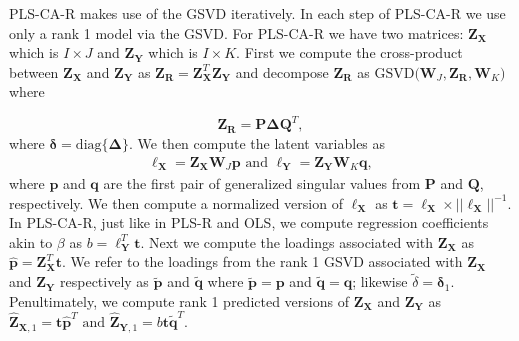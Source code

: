 \documentclass[12pt]{article}
\begin{document}
PLS-CA-R makes use of the GSVD iteratively. In each step of PLS-CA-R we
use only a rank 1 model via the GSVD. For PLS-CA-R we have two matrices:
\({\mathbf Z}_{\mathbf X}\) which is \(I \times J\) and
\({\mathbf Z}_{\mathbf Y}\) which is \(I \times K\). First we compute
the cross-product between \({\mathbf Z}_{\mathbf X}\) and
\({\mathbf Z}_{\mathbf Y}\) as
\({\mathbf Z}_{\mathbf R} = {\mathbf Z}_{\mathbf X}^{T}{\mathbf Z}_{\mathbf Y}\)
and decompose \({\mathbf Z}_{\mathbf R}\) as
\(\mathrm{GSVD(} {\mathbf W}_{J}, {\mathbf Z}_{\mathbf R}, {\mathbf W}_{K} \mathrm{)}\)
where

\begin{equation}
{\mathbf Z}_{\mathbf R} = {\mathbf P} {\boldsymbol \Delta} {\mathbf Q}^{T},
\end{equation} where
\({\boldsymbol \delta} = \mathrm{diag\{} {\boldsymbol \Delta} \mathrm{\}}\).
We then compute the latent variables as \begin{equation}
\begin{aligned}
{\boldsymbol \ell}_{\mathbf X} = {\mathbf Z}_{\mathbf X}{\mathbf W}_{J}{\mathbf p} \text{ and } {\boldsymbol \ell}_{\mathbf Y} = {\mathbf Z}_{\mathbf Y}{\mathbf W}_{K}{\mathbf q},
\label{eq:lvs}
\end{aligned}
\end{equation} where \({\mathbf p}\) and \({\mathbf q}\) are the first
pair of generalized singular values from \({\mathbf P}\) and
\({\mathbf Q}\), respectively. We then compute a normalized version of
\({\boldsymbol \ell}_{\mathbf X}\) as
\({\mathbf t} = {\boldsymbol \ell}_{\mathbf X} \times {{\lvert\lvert {\boldsymbol \ell}_{\mathbf X} \rvert\rvert}^{-1}}\).
In PLS-CA-R, just like in PLS-R and OLS, we compute regression
coefficients akin to \(\beta\) as
\(b = {\boldsymbol \ell}_{\mathbf Y}^{T}{\mathbf t}\). Next we compute
the loadings associated with \({\mathbf Z}_{\mathbf X}\) as
\(\widehat{\mathbf p} = {\mathbf Z}_{\mathbf X}^{T}{\mathbf t}\). We
refer to the loadings from the rank 1 GSVD associated with
\({\mathbf Z}_{\mathbf X}\) and \({\mathbf Z}_{\mathbf Y}\) respectively
as \(\widetilde{\mathbf p}\) and \(\widetilde{\mathbf q}\) where
\(\widetilde{\mathbf p} = {\mathbf p}\) and
\(\widetilde{\mathbf q} = {\mathbf q}\); likewise
\(\widetilde{\delta} = {\boldsymbol \delta}_{1}\). Penultimately, we
compute rank 1 predicted versions of \({\mathbf Z}_{\mathbf X}\) and
\({\mathbf Z}_{\mathbf Y}\) as
\(\widehat{\mathbf Z}_{{\mathbf X},1} = {\mathbf t}\widehat{\mathbf p}^{T} \text{ and } \widehat{\mathbf Z}_{{\mathbf Y},1} = b{\mathbf t}\widetilde{\mathbf q}^{T}\).
\end{document}
